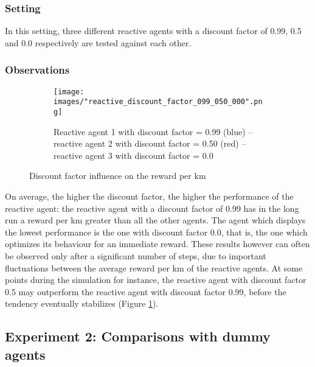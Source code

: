 \documentclass[10pt]{article}
\begin{document}
\subsubsection{Setting}
In this setting, three different reactive agents with a discount factor of 0.99, 0.5 and 0.0 respectively are tested against each other.

\subsubsection{Observations}

\begin{figure}[h!]
\centering
\begin{subfigure}[t]{0.47\textwidth}
\captionsetup{width=1.0\textwidth}
\texttt{[image: images/"reactive\_discount\_factor\_099\_050\_000".png]}
\caption{Reactive agent 1 with discount factor = 0.99 (blue) -- reactive agent 2 with discount factor = 0.50 (red) -- reactive agent 3 with discount factor = 0.0}
\end{subfigure}
\caption{Discount factor influence on the reward per km}
\label{discount factor}
\end{figure}

On average, the higher the discount factor, the higher the performance of the reactive agent: the reactive agent with a discount factor of 0.99 has in the long run a reward per km greater than all the other agents.
The agent which displays the lowest performance is the one with discount factor 0.0, that is, the one which optimizes its behaviour for an immediate reward.
These results however can often be observed only after a significant number of steps, due to important fluctuations between the average reward per km of the reactive agents.
At some points during the simulation for instance, the reactive agent with discount factor 0.5 may outperform the reactive agent with discount factor 0.99, before the tendency eventually stabilizes (Figure \ref{discount factor}).

\subsection{Experiment 2: Comparisons with dummy agents}
\end{document}

